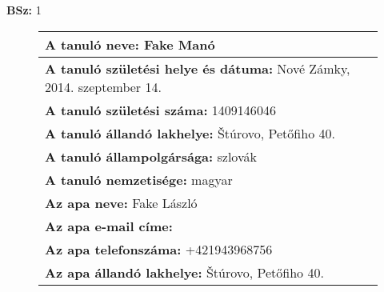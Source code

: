 \documentclass[10pt,a4paper]{article}
\begin{document}
    \vfill
    \textbf{BSz: }1
\newpage
    \begin{figure}[!ht]
    \begin{tabular}{|m{\textwidth}|}
    \hline \vspace{3pt}
    \textbf{A tanuló neve:} \hspace{0.5cm} Fake Manó \vspace{3pt} \\
\hline\vspace{3pt}
\textbf{A tanuló születési helye és dátuma:} \hspace{0.5cm} Nové Zámky, 2014. szeptember 14. \vspace{3pt} \\
\hline\vspace{3pt}
\textbf{A tanuló születési száma:} \hspace{0.5cm} 1409146046 \vspace{3pt} \\
\hline\vspace{3pt}
\textbf{A tanuló állandó lakhelye:} \hspace{0.5cm} Štúrovo, Petőfiho 40. \vspace{3pt} \\
\hline\vspace{3pt}
\textbf{A tanuló állampolgársága:} \hspace{0.5cm} szlovák \vspace{3pt} \\
\hline\vspace{3pt}
\textbf{A tanuló nemzetisége:} \hspace{0.5cm} magyar \vspace{3pt} \\
\hline\vspace{3pt}
\textbf{Az apa neve:} \hspace{0.5cm} Fake László \vspace{3pt} \\
\hline\vspace{3pt}
\textbf{Az apa e-mail címe:} \hspace{0.5cm}  \vspace{3pt} \\
\hline\vspace{3pt}
\textbf{Az apa telefonszáma:} \hspace{0.5cm} +421943968756 \vspace{3pt} \\
\hline\vspace{3pt}
\textbf{Az apa állandó lakhelye:} \hspace{0.5cm} Štúrovo, Petőfiho 40. \vspace{3pt} \\

\end{tabular}
\end{figure}
\end{document}
